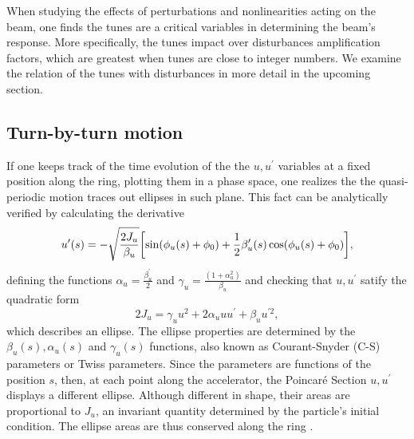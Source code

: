 When studying the effects of perturbations and nonlinearities acting on the beam, one finds the tunes are a critical variables in determining the beam's response. More specifically, the tunes impact over disturbances amplification factors, which are greatest when tunes are close to integer numbers. We examine the relation of the tunes with disturbances in more detail in the upcoming section.

\subsection{Turn-by-turn motion}
If one keeps track of the time evolution of the the $u, u^\prime$ variables at a fixed position along the ring, plotting them in a phase space, one realizes the the quasi-periodic motion traces out ellipses in such plane. This fact can be analytically verified by calculating the derivative
    \begin{equation}
        u^{\prime}(s) = - \sqrt{\frac{2J_u}{\beta_u}}\qty[\sin(\phi_u(s) + \phi_0) + \frac{1}{2}\beta_u^\prime(s)\cos(\phi_u(s) + \phi_0)],
        \label{eq:uprime}
    \end{equation}
    defining the functions $\alpha_u = \frac{\beta_u^\prime}{2}$  and $\gamma_u = \frac{(1+\alpha_u^2)}{\beta_u}$ and checking that $u, u^\prime$ satify the quadratic form
    \begin{equation}
        2J_u=\gamma_u u^{2}+2\alpha_u u u^{\prime}+\beta_u u^{\prime2},
     \end{equation}
which describes an ellipse. The ellipse properties are determined by the $\beta_u(s), \alpha_u(s)$ and $\gamma_u(s)$ functions, also known as Courant-Snyder (C-S) parameters or Twiss parameters. Since the parameters are functions of the position $s$, then, at each point along the accelerator, the Poincaré Section $u, u^\prime$ displays a different ellipse. Although different in shape, their areas are proportional to $J_u$, an invariant quantity determined by the particle's initial condition. The ellipse areas are thus conserved along the ring \cite{lee_accelerator_2004,wiedemann_particle_2015}.

